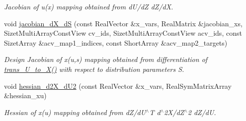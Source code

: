 \begin{DoxyCompactItemize}
\begin{DoxyCompactList}\small\item\em Jacobian of u(x) mapping obtained from d\+U/dZ d\+Z/dX. \end{DoxyCompactList}\item 
void \hyperlink{classPecos_1_1NatafTransformation_ae634a57bc8deb15bb17a9699b5035669}{jacobian\+\_\+d\+X\+\_\+dS} (const Real\+Vector \&x\+\_\+vars, Real\+Matrix \&jacobian\+\_\+xs, Sizet\+Multi\+Array\+Const\+View cv\+\_\+ids, Sizet\+Multi\+Array\+Const\+View acv\+\_\+ids, const Sizet\+Array \&acv\+\_\+map1\+\_\+indices, const Short\+Array \&acv\+\_\+map2\+\_\+targets)
\begin{DoxyCompactList}\small\item\em Design Jacobian of x(u,s) mapping obtained from differentiation of \hyperlink{classPecos_1_1NatafTransformation_a0a84860a9ed0cec52ed100edb49f209c}{trans\+\_\+\+U\+\_\+to\+\_\+\+X()} with respect to distribution parameters S. \end{DoxyCompactList}\item 
void \hyperlink{classPecos_1_1NatafTransformation_a6b88718fb820430ebbd87749b27b402a}{hessian\+\_\+d2\+X\+\_\+d\+U2} (const Real\+Vector \&x\+\_\+vars, Real\+Sym\+Matrix\+Array \&hessian\+\_\+xu)
\begin{DoxyCompactList}\small\item\em Hessian of x(u) mapping obtained from d\+Z/d\+U$^\wedge$T d$^\wedge$2\+X/d\+Z$^\wedge$2 d\+Z/dU. \end{DoxyCompactList}\end{DoxyCompactItemize}
